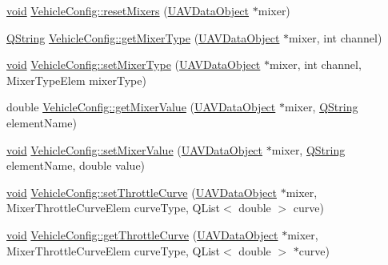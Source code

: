 \begin{DoxyCompactItemize}
\item 
\hyperlink{group___u_a_v_objects_plugin_ga444cf2ff3f0ecbe028adce838d373f5c}{void} \hyperlink{group___config_plugin_ga2d8c952fda6b946cc3e0d184830c16f4}{\-Vehicle\-Config\-::reset\-Mixers} (\hyperlink{class_u_a_v_data_object}{\-U\-A\-V\-Data\-Object} $\ast$mixer)
\item 
\hyperlink{group___u_a_v_objects_plugin_gab9d252f49c333c94a72f97ce3105a32d}{\-Q\-String} \hyperlink{group___config_plugin_ga701b45580113989b2875514df233a598}{\-Vehicle\-Config\-::get\-Mixer\-Type} (\hyperlink{class_u_a_v_data_object}{\-U\-A\-V\-Data\-Object} $\ast$mixer, int channel)
\item 
\hyperlink{group___u_a_v_objects_plugin_ga444cf2ff3f0ecbe028adce838d373f5c}{void} \hyperlink{group___config_plugin_ga060909ce68f927e2b3f6d7b14d36a3b8}{\-Vehicle\-Config\-::set\-Mixer\-Type} (\hyperlink{class_u_a_v_data_object}{\-U\-A\-V\-Data\-Object} $\ast$mixer, int channel, \-Mixer\-Type\-Elem mixer\-Type)
\item 
double \hyperlink{group___config_plugin_ga4043ba19db9003bbebdc196ccc54bc72}{\-Vehicle\-Config\-::get\-Mixer\-Value} (\hyperlink{class_u_a_v_data_object}{\-U\-A\-V\-Data\-Object} $\ast$mixer, \hyperlink{group___u_a_v_objects_plugin_gab9d252f49c333c94a72f97ce3105a32d}{\-Q\-String} element\-Name)
\item 
\hyperlink{group___u_a_v_objects_plugin_ga444cf2ff3f0ecbe028adce838d373f5c}{void} \hyperlink{group___config_plugin_ga7f2b470b423569fa6b07c81e21288e28}{\-Vehicle\-Config\-::set\-Mixer\-Value} (\hyperlink{class_u_a_v_data_object}{\-U\-A\-V\-Data\-Object} $\ast$mixer, \hyperlink{group___u_a_v_objects_plugin_gab9d252f49c333c94a72f97ce3105a32d}{\-Q\-String} element\-Name, double value)
\item 
\hyperlink{group___u_a_v_objects_plugin_ga444cf2ff3f0ecbe028adce838d373f5c}{void} \hyperlink{group___config_plugin_gaa0e88bc5f48d30ef5c1ef359ab2803ee}{\-Vehicle\-Config\-::set\-Throttle\-Curve} (\hyperlink{class_u_a_v_data_object}{\-U\-A\-V\-Data\-Object} $\ast$mixer, \-Mixer\-Throttle\-Curve\-Elem curve\-Type, \-Q\-List$<$ double $>$ curve)
\item 
\hyperlink{group___u_a_v_objects_plugin_ga444cf2ff3f0ecbe028adce838d373f5c}{void} \hyperlink{group___config_plugin_ga281f6c86ad38eaab7bb5722f91ea2242}{\-Vehicle\-Config\-::get\-Throttle\-Curve} (\hyperlink{class_u_a_v_data_object}{\-U\-A\-V\-Data\-Object} $\ast$mixer, \-Mixer\-Throttle\-Curve\-Elem curve\-Type, \-Q\-List$<$ double $>$ $\ast$curve)
\item 

\end{DoxyCompactItemize}
